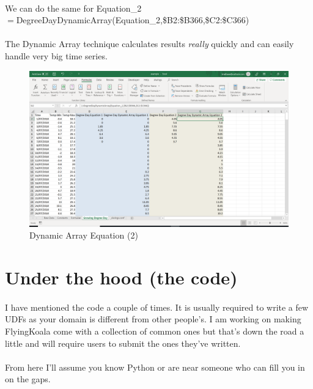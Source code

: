 \documentclass[12pt,a4paper,twoside,openright,titlepage]{article}
\begin{document}
\paragraph{} We can do the same for Equation\_2\\

$=$DegreeDayDynamicArray(Equation\_2,\$B2:\$B366,\$C2:\$C366) 

\paragraph{} The Dynamic Array technique calculates results \textsl{really} quickly and can easily handle very big time series.

\begin{figure}[h!]
	\centering
	\includegraphics[scale=0.4]{images/degreedaydynamicarray_equation_2.PNG}
	\caption{Dynamic Array Equation (2)}
\end{figure}

\section{Under the hood (the code)}

\paragraph{} I have mentioned the code a couple of times. It is usually required to write a few UDFs as your domain is different from other people's. I am working on making FlyingKoala come with a collection of common ones but that's down the road a little and will require users to submit the ones they've written.

\paragraph{} From here I'll assume you know Python or are near someone who can fill you in on the gaps.
\end{document}
